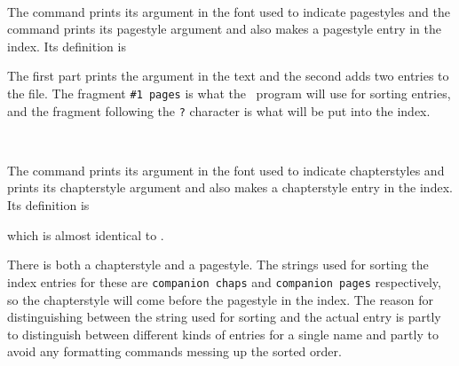 \begin{syntax}
\cmd{\Ppstyle} \cmd{\pstyle} \\
\end{syntax}
The command \cmd{\Ppstyle} prints its argument in the font used to indicate
pagestyles and the command \cmd{\pstyle} prints its pagestyle argument and also
makes a pagestyle entry in the index. Its definition is
\begin{lcode}
\newcommand*{\pstyle}[1]{\Ppstyle{#1}%
  \index{#1 pages?\Ppstyle{#1} (pagestyle)}%
  \index{pagestyle!#1?\Ppstyle{#1}}}
\end{lcode}
The first part prints the argument in the text and the second adds two
entries to the  file. The fragment \verb?#1 pages? is what 
the \Lmakeindex\ program will use for sorting entries, and the 
fragment following the \texttt{?} character is what will be put into the 
index.

\begin{syntax}
\cmd{\Pcstyle} \cmd{\cstyle} \\
\end{syntax}
The command \cmd{\Pcstyle} prints its argument in the font used to indicate
chapterstyles and \cmd{\cstyle} prints its chapterstyle argument 
and also makes a chapterstyle entry in the 
index. Its definition is
\begin{lcode}
\newcommand*{\cstyle}[1]{\Pcstyle{#1}%
  \index{#1 chaps?\Pcstyle{#1} (chapterstyle)}%
  \index{chapterstyle!#1?\Pcstyle{#1}}}
\end{lcode}
which is almost identical to \cmd{\pstyle}. 

    There is both a  chapterstyle and a 
pagestyle. The strings used for sorting the index entries for 
these are
\texttt{companion chaps} and \texttt{companion pages} respectively, so 
the chapterstyle will come before the pagestyle in the index. 
The reason for distinguishing between the string used for sorting and the 
actual entry is
partly to distinguish between different kinds of entries for a single name
and partly to avoid any formatting commands messing up the sorted order.

